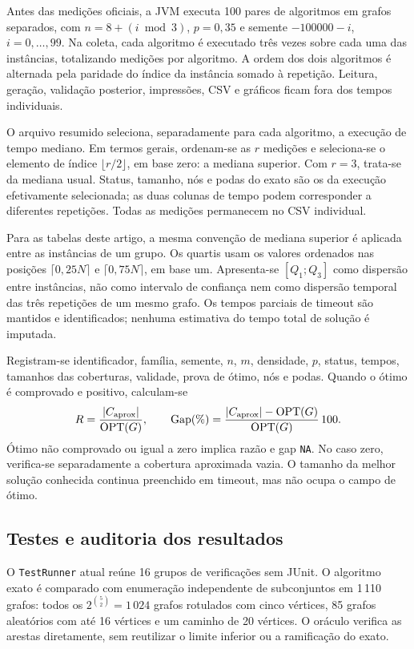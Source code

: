 Antes das medições oficiais, a JVM executa 100 pares de algoritmos
em grafos separados, com $n=8+(i\bmod3)$, $p=0{,}35$ e semente
$-100000-i$, $i=0,\ldots,99$. Na coleta, cada algoritmo é executado
três vezes sobre cada uma das \TotalInstances{} instâncias,
totalizando \RawMeasurements{} medições por algoritmo.
A ordem dos dois algoritmos é alternada pela paridade do índice da
instância somado à repetição. Leitura, geração, validação posterior,
impressões, CSV e gráficos ficam fora dos tempos individuais.

O arquivo resumido seleciona, separadamente para cada algoritmo,
a execução de tempo mediano. Em termos gerais, ordenam-se as $r$
medições e seleciona-se o elemento de índice $\lfloor r/2\rfloor$,
em base zero: a mediana superior. Com $r=3$, trata-se da mediana usual.
Status, tamanho, nós e podas do exato são os da execução efetivamente
selecionada; as duas colunas de tempo podem corresponder a diferentes
repetições. Todas as medições permanecem no CSV individual.

Para as tabelas deste artigo, a mesma convenção de mediana superior é
aplicada entre as instâncias de um grupo. Os quartis usam os valores
ordenados nas posições $\lceil0{,}25N\rceil$ e
$\lceil0{,}75N\rceil$, em base um. Apresenta-se $[Q_1;Q_3]$ como
dispersão entre instâncias, não como intervalo de confiança nem
como dispersão temporal das três repetições de um mesmo grafo.
Os tempos parciais de timeout são mantidos e identificados;
nenhuma estimativa do tempo total de solução é imputada.

Registram-se identificador, família, semente, $n$, $m$, densidade,
$p$, status, tempos, tamanhos das coberturas, validade, prova de ótimo,
nós e podas. Quando o ótimo é comprovado e positivo, calculam-se
\begin{equation}
  R=\frac{|C_{\mathrm{aprox}}|}{\operatorname{OPT}(G)},\qquad
  \operatorname{Gap}(\%)=
     \frac{|C_{\mathrm{aprox}}|-\operatorname{OPT}(G)}{\operatorname{OPT}(G)}\,100.
  \label{eq:quality}
\end{equation}
Ótimo não comprovado ou igual a zero implica razão e gap
\texttt{NA}. No caso zero, verifica-se separadamente a cobertura
aproximada vazia. O tamanho da melhor solução conhecida continua
preenchido em timeout, mas não ocupa o campo de ótimo.

\subsection{Testes e auditoria dos resultados}

O \texttt{TestRunner} atual reúne 16 grupos de verificações sem JUnit.
O algoritmo exato é comparado com enumeração independente de
subconjuntos em 1\,110 grafos: todos os $2^{\binom{5}{2}}=1\,024$
grafos rotulados com cinco vértices, 85 grafos aleatórios com até
16 vértices e um caminho de 20 vértices. O oráculo verifica as
arestas diretamente, sem reutilizar o limite inferior ou a
ramificação do exato.

